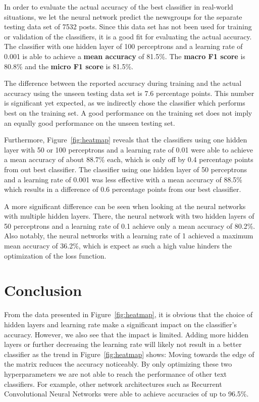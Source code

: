\documentclass[sigconf]{acmart}
\begin{document}
In order to evaluate the actual accuracy of the best classifier in real-world situations, we let the neural network predict the newsgroups for the separate testing data set of 7532 posts. Since this data set has not been used for training or validation of the classifiers, it is a good fit for evaluating the actual accuracy. The classifier with one hidden layer of 100 perceptrons and a learning rate of 0.001 is able to achieve a \textbf{mean accuracy} of 81.5\%. The \textbf{macro F1 score} is 80.8\% and the \textbf{micro F1 score} is 81.5\%.

The difference between the reported accuracy during training and the actual accuracy using the unseen testing data set is 7.6 percentage points. This number is significant yet expected, as we indirectly chose the classifier which performs best on the training set. A good performance on the training set does not imply an equally good performance on the unseen testing set.

Furthermore, Figure~\ref{fig:heatmap} reveals that the classifiers using one hidden layer with 50 or 100 perceptrons and a learning rate of 0.01 were able to achieve a mean accuracy of about 88.7\% each, which is only off by 0.4 percentage points from out best classifier. The classifier using one hidden layer of 50 perceptrons and a learning rate of 0.001 was less effective with a mean accuracy of 88.5\% which results in a difference of 0.6 percentage points from our best classifier.

A more significant difference can be seen when looking at the neural networks with multiple hidden layers. There, the neural network with two hidden layers of 50 perceptrons and a learning rate of 0.1 achieve only a mean accuracy of 80.2\%.
Also notably, the neural networks with a learning rate of 1 achieved a maximum mean accuracy of 36.2\%, which is expect as such a high value hinders the optimization of the loss function.

\section{Conclusion}

From the data presented in Figure~\ref{fig:heatmap}, it is obvious that the choice of hidden layers and learning rate make a significant impact on the classifier's accuracy. However, we also see that the impact is limited. 
Adding more hidden layers or further decreasing the learning rate will likely not result in a better classifier as the trend in Figure~\ref{fig:heatmap} shows: Moving towards the edge of the matrix reduces the accuracy noticeably. By only optimizing these two hyperparameters we are not able to reach the performance of other text classifiers. For example, other network architectures such as Recurrent Convolutional Neural Networks were able to achieve accuracies of up to 96.5\%\cite{rcnn}.
\end{document}
